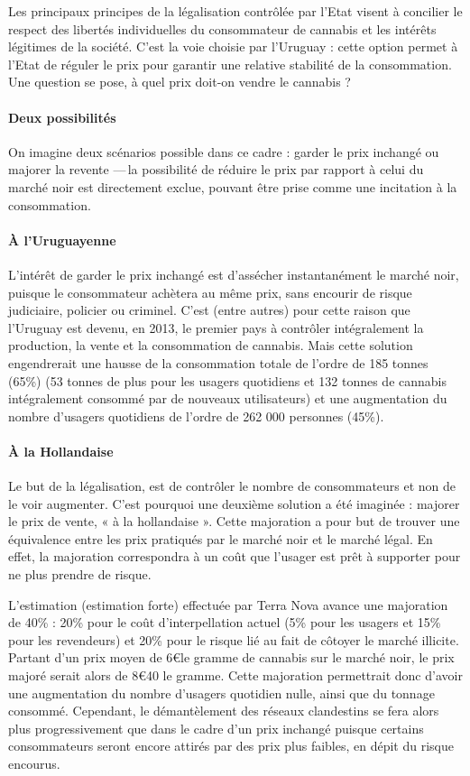 Les principaux principes de la légalisation contrôlée par l’Etat visent à concilier le respect des libertés individuelles du consommateur de cannabis et les intérêts légitimes de la société. C’est la voie choisie par l’Uruguay : cette option permet à l’Etat de réguler le prix pour garantir une relative stabilité de la consommation. Une question se pose, à quel prix doit-on vendre le cannabis ?

\paragraph{Deux possibilités} On imagine deux scénarios possible dans ce cadre : garder le prix inchangé ou majorer la revente ---\,la possibilité de réduire le prix par rapport à celui du marché noir est directement exclue, pouvant être prise comme une incitation à la consommation.

\paragraph{À l'Uruguayenne} L’intérêt de garder le prix inchangé est d’assécher instantanément le marché noir, puisque le consommateur achètera au même prix, sans encourir de risque judiciaire, policier ou criminel. C’est (entre autres) pour cette raison que l’Uruguay est devenu, en 2013, le premier pays à contrôler intégralement la production, la vente et la consommation de cannabis. Mais cette solution engendrerait une hausse de la consommation totale de l’ordre de 185 tonnes (65\%) (53 tonnes de plus pour les usagers quotidiens et 132 tonnes de cannabis intégralement consommé par de nouveaux utilisateurs)  et une augmentation du nombre d’usagers quotidiens de l’ordre de 262 000 personnes (45\%).

\paragraph{À la Hollandaise} Le but de la légalisation, est de contrôler le nombre de consommateurs et non de le voir augmenter. C’est pourquoi une deuxième solution a été imaginée : majorer le prix de vente, « à la hollandaise ». Cette majoration a pour but de trouver une équivalence entre les prix pratiqués par le marché noir et le marché légal. En effet, la majoration correspondra à un coût que l’usager est prêt à supporter pour ne plus prendre de risque.

L’estimation (estimation forte) effectuée par Terra Nova avance une majoration de 40\% : 20\% pour le coût d’interpellation actuel (5\% pour les usagers et 15\% pour les revendeurs) et 20\% pour le risque lié au fait de côtoyer le marché illicite. Partant d’un prix moyen de 6\euro le gramme de cannabis sur le marché noir, le prix majoré serait alors de 8\euro 40 le gramme. Cette majoration permettrait donc d’avoir une augmentation du nombre d’usagers quotidien nulle, ainsi que du tonnage consommé. Cependant, le démantèlement des réseaux clandestins se fera alors plus progressivement que dans le cadre d’un prix inchangé puisque certains consommateurs seront encore attirés par des prix plus faibles, en dépit du risque encourus.

